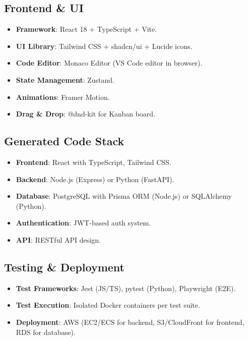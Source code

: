 \documentclass[11pt,a4paper]{article}
\begin{document}
\subsection{Frontend \& UI}

\begin{itemize}
  \item \textbf{Framework}: React 18 + TypeScript + Vite.
  \item \textbf{UI Library}: Tailwind CSS + shadcn/ui + Lucide icons.
  \item \textbf{Code Editor}: Monaco Editor (VS Code editor in browser).
  \item \textbf{State Management}: Zustand.
  \item \textbf{Animations}: Framer Motion.
  \item \textbf{Drag \& Drop}: @dnd-kit for Kanban board.
\end{itemize}

\subsection{Generated Code Stack}

\begin{itemize}
  \item \textbf{Frontend}: React with TypeScript, Tailwind CSS.
  \item \textbf{Backend}: Node.js (Express) or Python (FastAPI).
  \item \textbf{Database}: PostgreSQL with Prisma ORM (Node.js) or SQLAlchemy (Python).
  \item \textbf{Authentication}: JWT-based auth system.
  \item \textbf{API}: RESTful API design.
\end{itemize}

\subsection{Testing \& Deployment}

\begin{itemize}
  \item \textbf{Test Frameworks}: Jest (JS/TS), pytest (Python), Playwright (E2E).
  \item \textbf{Test Execution}: Isolated Docker containers per test suite.
  \item \textbf{Deployment}: AWS (EC2/ECS for backend, S3/CloudFront for frontend, RDS for database).
\end{itemize}
\end{document}
